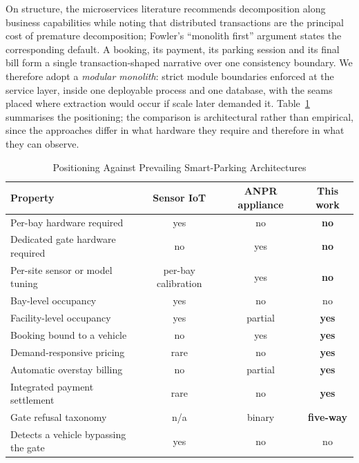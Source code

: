\documentclass[journal,onecolumn,11pt]{IEEEtran}
\begin{document}
On structure, the microservices literature \cite{newman2021} recommends
decomposition along business capabilities while noting that distributed
transactions are the principal cost of premature decomposition; Fowler's
``monolith first'' argument \cite{fowler2015monolithfirst} states the
corresponding default. A booking, its payment, its parking session and its
final bill form a single transaction-shaped narrative over one consistency
boundary. We therefore adopt a \emph{modular monolith}: strict module
boundaries enforced at the service layer, inside one deployable process and one
database, with the seams placed where extraction would occur if scale later
demanded it. Table~\ref{tab:related} summarises the positioning; the comparison
is architectural rather than empirical, since the approaches differ in what
hardware they require and therefore in what they can observe.

\begin{table}[!t]
\caption{Positioning Against Prevailing Smart-Parking Architectures}
\label{tab:related}
\centering
\small
\begin{tabular}{@{}lccc@{}}
\toprule
\textbf{Property} & \textbf{Sensor IoT} \cite{khanna2016iot,lin2017survey}
  & \textbf{ANPR appliance} \cite{du2013alpr} & \textbf{This work} \\
\midrule
Per-bay hardware required        & yes      & no       & \textbf{no} \\
Dedicated gate hardware required & no       & yes      & \textbf{no} \\
Per-site sensor or model tuning  & per-bay calibration & yes & \textbf{no} \\
Bay-level occupancy              & yes      & no       & no \\
Facility-level occupancy         & yes      & partial  & \textbf{yes} \\
Booking bound to a vehicle       & no       & yes      & \textbf{yes} \\
Demand-responsive pricing        & rare     & no       & \textbf{yes} \\
Automatic overstay billing       & no       & partial  & \textbf{yes} \\
Integrated payment settlement    & rare \cite{kotb2016review} & no & \textbf{yes} \\
Gate refusal taxonomy            & n/a      & binary   & \textbf{five-way} \\
Detects a vehicle bypassing the gate & yes  & no       & no \\
\bottomrule
\end{tabular}
\end{table}
\end{document}
